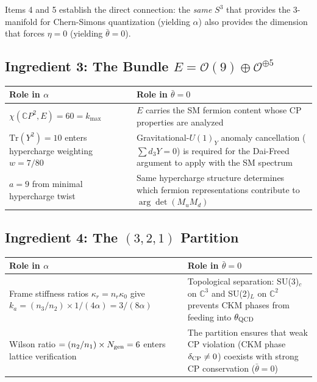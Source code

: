 \documentclass[11pt]{article}
\theoremstyle{remark}
\begin{document}
Items 4 and 5 establish the direct connection: the \emph{same} $S^3$ that
provides the 3-manifold for Chern-Simons quantization (yielding $\alpha$) also
provides the dimension that forces $\eta = 0$ (yielding $\bar\theta = 0$).

\subsection{Ingredient 3: The Bundle $E = \mathcal{O}(9) \oplus \mathcal{O}^{\oplus 5}$}

\begin{center}
\renewcommand{\arraystretch}{1.3}
\begin{tabular}{p{}p{}}
\hline
\textbf{Role in $\alpha$} & \textbf{Role in $\bar\theta = 0$} \\
\hline
$\chi(\mathbb{C}P^2, E) = 60 = k_{\max}$ &
$E$ carries the SM fermion content whose CP properties are analyzed \\[6pt]
$\mathrm{Tr}(Y^2) = 10$ enters hypercharge weighting
$w = 7/80$ &
Gravitational-$U(1)_Y$ anomaly cancellation
($\sum d_3 Y = 0$) is required for the Dai-Freed
argument to apply with the SM spectrum \\[6pt]
$a = 9$ from minimal hypercharge twist &
Same hypercharge structure determines which fermion
representations contribute to $\arg\det(M_u M_d)$ \\
\hline
\end{tabular}
\end{center}

\subsection{Ingredient 4: The $(3,2,1)$ Partition}

\begin{center}
\renewcommand{\arraystretch}{1.3}
\begin{tabular}{p{}p{}}
\hline
\textbf{Role in $\alpha$} & \textbf{Role in $\bar\theta = 0$} \\
\hline
Frame stiffness ratios $\kappa_r = n_r \kappa_0$ give
$k_a = (n_3/n_2) \times 1/(4\alpha) = 3/(8\alpha)$ &
Topological separation: SU(3)$_c$ on $\mathbb{C}^3$
and SU(2)$_L$ on $\mathbb{C}^2$ prevents CKM phases
from feeding into $\theta_{\rm QCD}$ \\[6pt]
Wilson ratio $= (n_2/n_1) \times N_{\rm gen} = 6$
enters lattice verification &
The partition ensures that weak CP violation
(CKM phase $\delta_{\rm CP} \neq 0$) coexists with
strong CP conservation ($\bar\theta = 0$) \\
\hline
\end{tabular}
\end{center}
\end{document}
